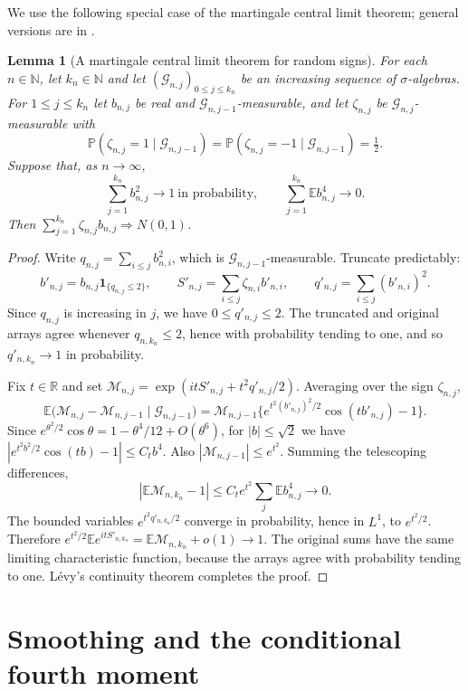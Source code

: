 \documentclass[11pt]{amsart}
\newtheorem{lemma}[theorem]{Lemma}
\theoremstyle{remark}
\numberwithin{equation}{section}
\newcommand{\E}{\mathbb{E}}
\renewcommand{\P}{\mathbb{P}}
\newcommand{\R}{\mathbb{R}}
\newcommand{\N}{\mathbb{N}}
\newcommand{\one}{\mathbf{1}}
\begin{document}
We use the following special case of the martingale central limit theorem; general versions are in \cite[Chapter~3]{HH}.

\begin{lemma}[A martingale central limit theorem for random signs]\label{lem:mclt}
For each $n\in\N$, let $k_n\in\N$ and let $(\mathcal G_{n,j})_{0\le j\le k_n}$ be an increasing sequence of $\sigma$-algebras. For $1\le j\le k_n$ let $b_{n,j}$ be real and $\mathcal G_{n,j-1}$-measurable, and let $\zeta_{n,j}$ be $\mathcal G_{n,j}$-measurable with
\[
\P(\zeta_{n,j}=1\mid\mathcal G_{n,j-1})=\P(\zeta_{n,j}=-1\mid\mathcal G_{n,j-1})=\tfrac12 .
\]
Suppose that, as $n\to\infty$,
\[
\sum_{j=1}^{k_n}b_{n,j}^2\longrightarrow1\ \text{in probability},\qquad\sum_{j=1}^{k_n}\E b_{n,j}^4\longrightarrow0 .
\]
Then $\sum_{j=1}^{k_n}\zeta_{n,j}b_{n,j}\Rightarrow N(0,1)$.
\end{lemma}

\begin{proof}
Write $q_{n,j}=\sum_{i\le j}b_{n,i}^2$, which is $\mathcal G_{n,j-1}$-measurable. Truncate predictably:
\[
b'_{n,j}=b_{n,j}\one_{\{q_{n,j}\le2\}},\qquad S'_{n,j}=\sum_{i\le j}\zeta_{n,i}b'_{n,i},\qquad q'_{n,j}=\sum_{i\le j}(b'_{n,i})^2 .
\]
Since $q_{n,j}$ is increasing in $j$, we have $0\le q'_{n,j}\le2$. The truncated and original arrays agree whenever $q_{n,k_n}\le2$, hence with probability tending to one, and so $q'_{n,k_n}\to1$ in probability.

Fix $t\in\R$ and set $\mathcal M_{n,j}=\exp(itS'_{n,j}+t^2q'_{n,j}/2)$. Averaging over the sign $\zeta_{n,j}$,
\[
\E\bigl(\mathcal M_{n,j}-\mathcal M_{n,j-1}\mid\mathcal G_{n,j-1}\bigr)=\mathcal M_{n,j-1}\bigl\{e^{t^2(b'_{n,j})^2/2}\cos(tb'_{n,j})-1\bigr\}.
\]
Since $e^{\theta^2/2}\cos\theta=1-\theta^4/12+O(\theta^6)$, for $|b|\le\sqrt2$ we have $|e^{t^2b^2/2}\cos(tb)-1|\le C_tb^4$. Also $|\mathcal M_{n,j-1}|\le e^{t^2}$. Summing the telescoping differences,
\[
|\E\mathcal M_{n,k_n}-1|\le C_te^{t^2}\sum_j\E b_{n,j}^4\longrightarrow0 .
\]
The bounded variables $e^{t^2q'_{n,k_n}/2}$ converge in probability, hence in $L^1$, to $e^{t^2/2}$. Therefore $e^{t^2/2}\E e^{itS'_{n,k_n}}=\E\mathcal M_{n,k_n}+o(1)\to1$. The original sums have the same limiting characteristic function, because the arrays agree with probability tending to one. L\'evy's continuity theorem completes the proof.
\end{proof}

\section{Smoothing and the conditional fourth moment}\label{sec:smooth}
\end{document}
